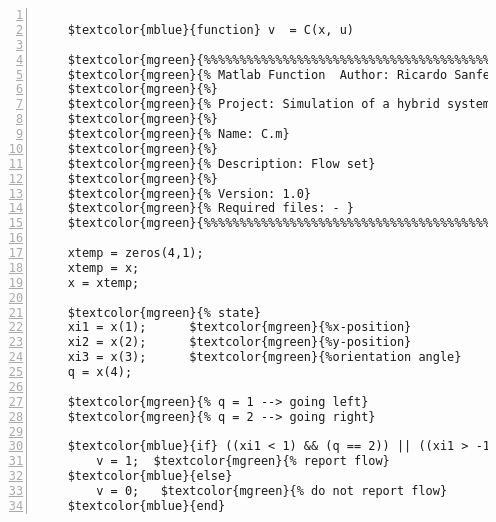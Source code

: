 %  
%  
%  
%  
  
  
\DefineShortVerb[fontfamily=courier,fontseries=m]{\$} 
\DefineShortVerb[fontfamily=courier,fontseries=b]{\#} 
  
\begin{Verbatim}[commandchars=\$\{\},numbers=left,numbersep=2pt] 

    $textcolor{mblue}{function} v  = C(x, u)  
     
    $textcolor{mgreen}{%%%%%%%%%%%%%%%%%%%%%%%%%%%%%%%%%%%%%%%%%%%%%%%%%%%%%%%%%%%%%%%%%%%%%%%%%%%} 
    $textcolor{mgreen}{% Matlab Function  Author: Ricardo Sanfelice} 
    $textcolor{mgreen}{%} 
    $textcolor{mgreen}{% Project: Simulation of a hybrid system (Vehicle Traveling on a Track)} 
    $textcolor{mgreen}{%} 
    $textcolor{mgreen}{% Name: C.m} 
    $textcolor{mgreen}{%} 
    $textcolor{mgreen}{% Description: Flow set} 
    $textcolor{mgreen}{%} 
    $textcolor{mgreen}{% Version: 1.0} 
    $textcolor{mgreen}{% Required files: - } 
    $textcolor{mgreen}{%%%%%%%%%%%%%%%%%%%%%%%%%%%%%%%%%%%%%%%%%%%%%%%%%%%%%%%%%%%%%%%%%%%%%%%%%%%} 
     
    xtemp = zeros(4,1); 
    xtemp = x; 
    x = xtemp; 
     
    $textcolor{mgreen}{% state} 
    xi1 = x(1);      $textcolor{mgreen}{%x-position} 
    xi2 = x(2);      $textcolor{mgreen}{%y-position} 
    xi3 = x(3);      $textcolor{mgreen}{%orientation angle} 
    q = x(4);   
     
    $textcolor{mgreen}{% q = 1 --> going left} 
    $textcolor{mgreen}{% q = 2 --> going right} 
     
    $textcolor{mblue}{if} ((xi1 < 1) && (q == 2)) || ((xi1 > -1) && (q == 1))  $textcolor{mgreen}{% flow condition} 
        v = 1;  $textcolor{mgreen}{% report flow} 
    $textcolor{mblue}{else}  
        v = 0;   $textcolor{mgreen}{% do not report flow} 
    $textcolor{mblue}{end}  
\end{Verbatim}  
  
\UndefineShortVerb{\$} 
\UndefineShortVerb{\#} 
 